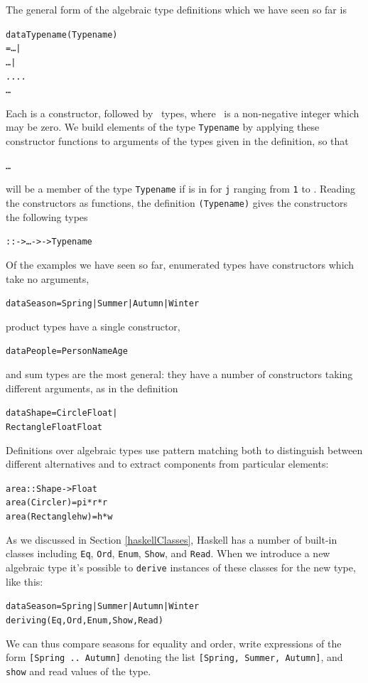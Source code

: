 The general form of the algebraic type definitions which we have seen so far is 
\begin{alltt}
data Typename \hfill (Typename)
  =   \ldots {} | 
      \ldots {} | 
        ....
      \ldots {}   
\end{alltt}
Each \texttt{} is a constructor, followed by 
\ types, where \ is a non-negative integer which may
be zero. We build elements of the type \texttt{Typename} by applying these constructor
functions to arguments of the types given in the definition, so that
\begin{alltt}
  \ldots {}
\end{alltt}
will be a member of the type \texttt{Typename} if  is 
in  for \texttt{j} ranging from \texttt{1} to . 
Reading the constructors as functions, the 
definition \texttt{(Typename)} gives the constructors the following
types
\begin{alltt}
 ::  -> \ldots ->  -> Typename
\end{alltt}
Of the examples we have seen so far, enumerated types have constructors which take no arguments, 
\begin{alltt}
data Season = Spring | Summer | Autumn | Winter
\end{alltt}
product types have a single constructor, 
\begin{alltt}
data People = Person Name Age 
\end{alltt}
and sum types are the most general: they have a number of constructors taking different arguments, as in the definition
\begin{alltt}
data Shape = Circle Float |
             Rectangle Float Float
\end{alltt}
Definitions over algebraic types use pattern matching both to distinguish between different alternatives and to extract components from particular elements:
\begin{alltt}
area :: Shape -> Float
area (Circle r)      = pi*r*r
area (Rectangle h w) = h*w
\end{alltt}
As we discussed in Section \ref{haskellClasses},  Haskell has a number of built-in classes including
 \texttt{Eq},  \texttt{Ord}, 
  \texttt{Enum}, \texttt{Show}, and \texttt{Read}. When we introduce a new algebraic type it's possible to \texttt{derive} instances of these classes for the new type, like this:
\begin{alltt}
data Season = Spring | Summer | Autumn | Winter 
              deriving (Eq,Ord,Enum,Show,Read)
\end{alltt}
We can thus compare seasons for equality and order, write expressions of
the form \texttt{[Spring .. Autumn]} denoting the list \texttt{[Spring, Summer, Autumn]}, and \texttt{show} and read values of the type.


